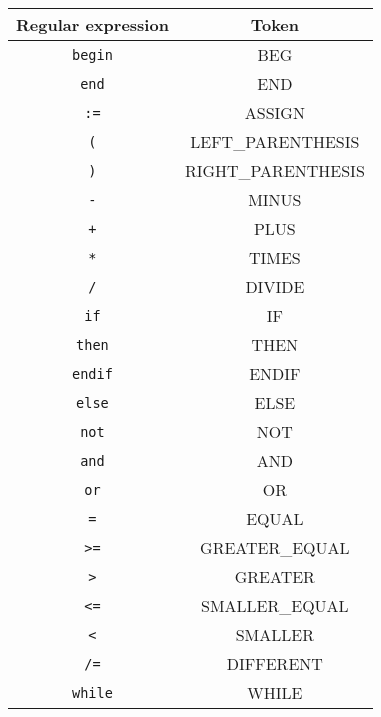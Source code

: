 \documentclass[a4paper]{article}
\begin{document}
\begin{figure}[ht]
  \centering
\begin{tabular}{|c|c|}
  \hline
  Regular expression        & Token     \\
  \hline
  \hline
  \texttt{begin}        & BEG \\
  \hline
  \texttt{end}          & END   \\
  \hline
  \texttt{:=}               & ASSIGN    \\
  \hline
  \texttt{(}                & LEFT\_PARENTHESIS    \\
  \hline
  \texttt{)}                & RIGHT\_PARENTHESIS    \\
  \hline
  \texttt{-}                & MINUS     \\
  \hline
  \texttt{+}                & PLUS      \\
  \hline
  \texttt{*}                & TIMES     \\
  \hline
  \texttt{/}                & DIVIDE    \\
  \hline
  \texttt{if}               & IF        \\
  \hline
  \texttt{then}             & THEN      \\
  \hline
  \texttt{endif}            & ENDIF     \\
  \hline
  \texttt{else}             & ELSE      \\
  \hline
  \texttt{not}              & NOT       \\
  \hline
  \texttt{and}              & AND       \\
  \hline
  \texttt{or}               & OR        \\
  \hline
  \texttt{=}                & EQUAL        \\
  \hline
  \texttt{>=}               & GREATER\_EQUAL       \\
  \hline
  \texttt{>}                & GREATER        \\
  \hline
  \texttt{<=}               & SMALLER\_EQUAL       \\
  \hline
  \texttt{<}                & SMALLER        \\
  \hline
  \texttt{/=}               & DIFFERENT       \\
  \hline
  \texttt{while}            & WHILE     \\

\end{tabular}
\end{figure}
\end{document}
